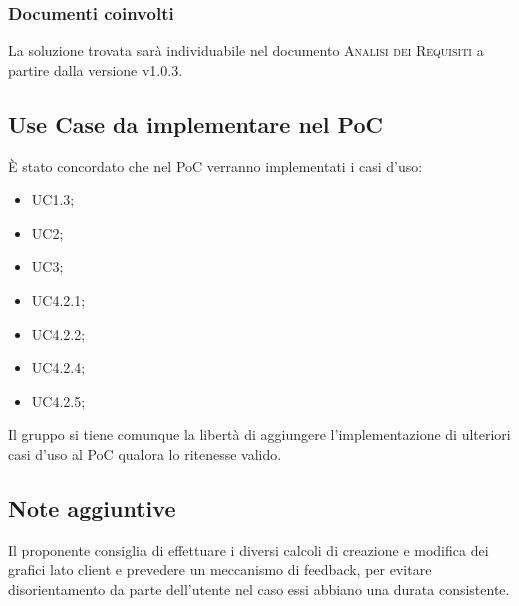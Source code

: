 \documentclass{article}
\begin{document}
\subsubsection*{Documenti coinvolti}
La soluzione trovata sar\`{a} individuabile nel documento \textsc{Analisi dei Requisiti} a partire dalla versione v1.0.3.

\subsection{Use Case da implementare nel PoC}
\label{itm:4}
\`{E} stato concordato che nel PoC verranno implementati i casi d'uso:
\begin{itemize}
	\item UC1.3;
	\item UC2;
	\item UC3;
	\item UC4.2.1;
	\item UC4.2.2;
	\item UC4.2.4;
	\item UC4.2.5;
\end{itemize}
Il gruppo si tiene comunque la libert\`{a} di aggiungere l'implementazione di ulteriori casi d'uso al PoC qualora lo ritenesse valido.
\subsection{Note aggiuntive}
\label{sub:note}
Il proponente consiglia di effettuare i diversi calcoli di creazione e modifica dei grafici lato client e prevedere un meccanismo di feedback,
per evitare disorientamento da parte dell'utente nel caso essi abbiano una durata consistente.
\end{document}
